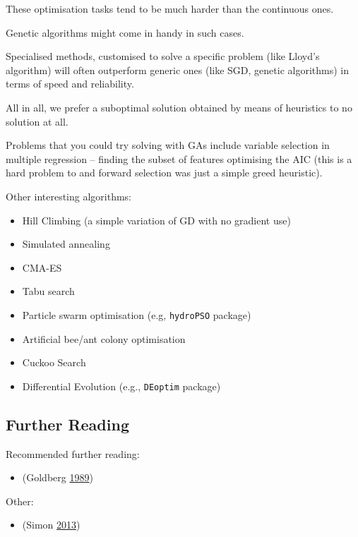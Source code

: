 \documentclass[10pt,b5paper,krantz1]{krantz}
\providecommand{\tightlist}{%
  \setlength{\itemsep}{0pt}\setlength{\parskip}{0pt}}
\renewenvironment{quote}{\begin{VF}}{\end{VF}}
\begin{document}
\begin{quote}
These optimisation tasks tend to be much harder than the continuous ones.
\end{quote}

Genetic algorithms might come in handy in such cases.

Specialised methods, customised to solve a specific problem (like Lloyd's algorithm)
will often outperform generic ones (like SGD, genetic algorithms)
in terms of speed and reliability.

All in all, we prefer a suboptimal solution obtained by means of heuristics
to no solution at all.

Problems that you could try solving with GAs include variable selection
in multiple regression -- finding the subset of features optimising the AIC
(this is a hard problem to and forward selection was just a simple greed heuristic).

Other interesting algorithms:

\begin{itemize}
\tightlist
\item
  Hill Climbing (a simple variation of GD with no gradient use)
\item
  Simulated annealing
\item
  CMA-ES
\item
  Tabu search
\item
  Particle swarm optimisation (e.g, \texttt{hydroPSO} package)
\item
  Artificial bee/ant colony optimisation
\item
  Cuckoo Search
\item
  Differential Evolution (e.g., \texttt{DEoptim} package)
\end{itemize}

\hypertarget{further-reading-7}{%
\subsection{Further Reading}\label{further-reading-7}}

Recommended further reading:

\begin{itemize}
\tightlist
\item
  (Goldberg \protect\hyperlink{ref-genetic}{1989})
\end{itemize}

Other:

\begin{itemize}
\tightlist
\item
  (Simon \protect\hyperlink{ref-evolution}{2013})
\end{itemize}
\end{document}
